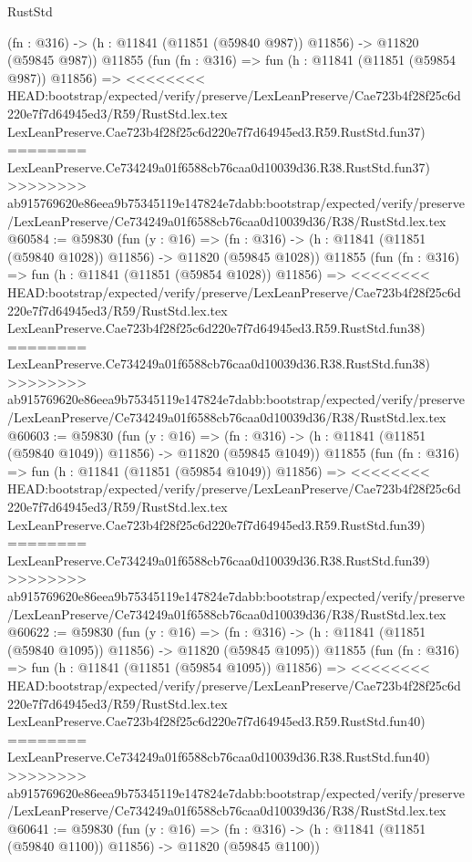 \begin{lexlean}{RustStd}
\begin{coremodule}
{\begin{coremodule}
{{{{{{{{{{{{{{{{{{{{{{{{{{{{{{{{{{{{{{{{{{{{{{{{{{    (fn : @316) -> (h : @11841 (@11851 (@59840 @987)) @11856) -> @11820 (@59845 @987))
    @11855
    (fun (fn : @316) =>
    fun (h : @11841 (@11851 (@59854 @987)) @11856) =>
<<<<<<<< HEAD:bootstrap/expected/verify/preserve/LexLeanPreserve/Cae723b4f28f25c6d220e7f7d64945ed3/R59/RustStd.lex.tex
    LexLeanPreserve.Cae723b4f28f25c6d220e7f7d64945ed3.R59.RustStd.fun37)
========
    LexLeanPreserve.Ce734249a01f6588cb76caa0d10039d36.R38.RustStd.fun37)
>>>>>>>> ab915769620e86eea9b75345119e147824e7dabb:bootstrap/expected/verify/preserve/LexLeanPreserve/Ce734249a01f6588cb76caa0d10039d36/R38/RustStd.lex.tex
@60584 := @59830
    (fun (y : @16) =>
    (fn : @316) -> (h : @11841 (@11851 (@59840 @1028)) @11856) -> @11820 (@59845 @1028))
    @11855
    (fun (fn : @316) =>
    fun (h : @11841 (@11851 (@59854 @1028)) @11856) =>
<<<<<<<< HEAD:bootstrap/expected/verify/preserve/LexLeanPreserve/Cae723b4f28f25c6d220e7f7d64945ed3/R59/RustStd.lex.tex
    LexLeanPreserve.Cae723b4f28f25c6d220e7f7d64945ed3.R59.RustStd.fun38)
========
    LexLeanPreserve.Ce734249a01f6588cb76caa0d10039d36.R38.RustStd.fun38)
>>>>>>>> ab915769620e86eea9b75345119e147824e7dabb:bootstrap/expected/verify/preserve/LexLeanPreserve/Ce734249a01f6588cb76caa0d10039d36/R38/RustStd.lex.tex
@60603 := @59830
    (fun (y : @16) =>
    (fn : @316) -> (h : @11841 (@11851 (@59840 @1049)) @11856) -> @11820 (@59845 @1049))
    @11855
    (fun (fn : @316) =>
    fun (h : @11841 (@11851 (@59854 @1049)) @11856) =>
<<<<<<<< HEAD:bootstrap/expected/verify/preserve/LexLeanPreserve/Cae723b4f28f25c6d220e7f7d64945ed3/R59/RustStd.lex.tex
    LexLeanPreserve.Cae723b4f28f25c6d220e7f7d64945ed3.R59.RustStd.fun39)
========
    LexLeanPreserve.Ce734249a01f6588cb76caa0d10039d36.R38.RustStd.fun39)
>>>>>>>> ab915769620e86eea9b75345119e147824e7dabb:bootstrap/expected/verify/preserve/LexLeanPreserve/Ce734249a01f6588cb76caa0d10039d36/R38/RustStd.lex.tex
@60622 := @59830
    (fun (y : @16) =>
    (fn : @316) -> (h : @11841 (@11851 (@59840 @1095)) @11856) -> @11820 (@59845 @1095))
    @11855
    (fun (fn : @316) =>
    fun (h : @11841 (@11851 (@59854 @1095)) @11856) =>
<<<<<<<< HEAD:bootstrap/expected/verify/preserve/LexLeanPreserve/Cae723b4f28f25c6d220e7f7d64945ed3/R59/RustStd.lex.tex
    LexLeanPreserve.Cae723b4f28f25c6d220e7f7d64945ed3.R59.RustStd.fun40)
========
    LexLeanPreserve.Ce734249a01f6588cb76caa0d10039d36.R38.RustStd.fun40)
>>>>>>>> ab915769620e86eea9b75345119e147824e7dabb:bootstrap/expected/verify/preserve/LexLeanPreserve/Ce734249a01f6588cb76caa0d10039d36/R38/RustStd.lex.tex
@60641 := @59830
    (fun (y : @16) =>
    (fn : @316) -> (h : @11841 (@11851 (@59840 @1100)) @11856) -> @11820 (@59845 @1100))
}}}}}}}}}}}}}}}}}}}}}}}}}}}}}}}}}}}}}}}}}}}}}}}}}}
\end{coremodule}}
\end{coremodule}
\end{lexlean}
